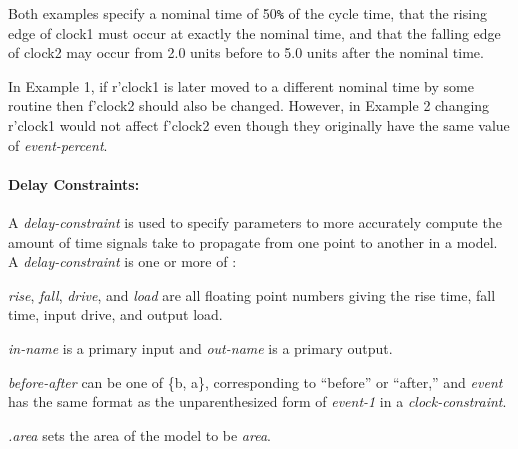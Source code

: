 {\begin{pespace}
Both examples specify a nominal time of 50{\verb|%|} of the cycle time, that
the rising edge of clock1 must occur at exactly the nominal time, and that
the falling edge of clock2 may occur from 2.0 units before to 5.0 units
after the nominal time.

In Example 1, if r'clock1 is later moved to a different nominal time by some
routine then f'clock2 should also be changed.  However, in Example 2 changing
r'clock1 would not affect f'clock2 even though they originally have the same
value of {\em event-percent}.

\paragraph{Delay Constraints:}

A {\em delay-constraint} is used to specify parameters to more accurately
compute the amount of time signals take to propagate from one point to
another in a model.  A {\em delay-constraint} is one or more of :

\begin{description}
\item {\em rise}, {\em fall}, {\em drive}, and {\em load} are all floating
point numbers giving the rise time, fall time, input drive, and output load.

\item {\em in-name} is a primary input and {\em out-name} is a primary
output.

\item {\em before-after} can be one of \{b, a\}, corresponding to ``before''
or ``after,'' and {\em event} has the same format as the unparenthesized
form of {\em event-1} in a {\em clock-constraint}.

\item {\em .area} sets the area of the model to be {\em area}.


\end{description}
\end{pespace}}
